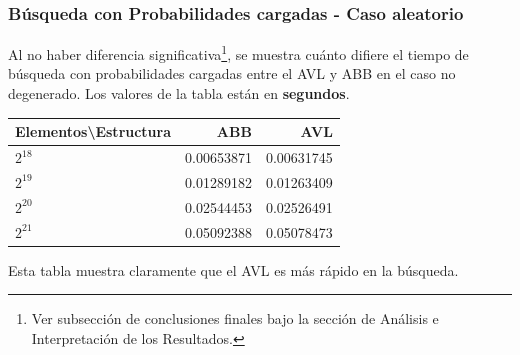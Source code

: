 \documentclass[12pt,letterpaper]{report}
\begin{document}
\subsubsection{Búsqueda con Probabilidades cargadas - Caso aleatorio}
Al no haber diferencia significativa\footnote{Ver subsección de conclusiones finales bajo la sección de Análisis e Interpretación de los Resultados.}, se muestra cuánto difiere el tiempo de búsqueda con probabilidades cargadas entre el AVL y ABB en el caso no degenerado. Los valores de la tabla están en \textbf{segundos}.

\begin{center}
  \begin{tabular}{|l|r|r|}
    \hline
    Elementos\textbackslash Estructura & ABB & AVL \\ \hline
    $2^{18}$ & 0.00653871 & 0.00631745  \\ \hline
    $2^{19}$ & 0.01289182 & 0.01263409  \\ \hline
    $2^{20}$ & 0.02544453 & 0.02526491  \\ \hline
    $2^{21}$ & 0.05092388 & 0.05078473 \\ \hline
  \end{tabular}
\end{center}

Esta tabla muestra claramente que el AVL es más rápido en la búsqueda.
\end{document}
